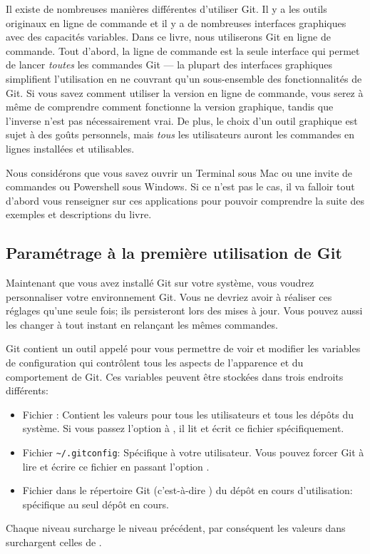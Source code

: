 Il existe de nombreuses manières différentes d'utiliser Git.
Il y a les outils originaux en ligne de commande et il y a de nombreuses interfaces graphiques avec des capacités variables.
Dans ce livre, nous utiliserons Git en ligne de commande.
Tout d'abord, la ligne de commande est la seule interface qui permet de lancer \emph{toutes} les commandes Git --- la plupart des interfaces graphiques simplifient l'utilisation en ne couvrant qu'un sous-ensemble des fonctionnalités de Git.
Si vous savez comment utiliser la version en ligne de commande, vous serez à même de comprendre comment fonctionne la version graphique, tandis que l'inverse n'est pas nécessairement vrai.
De plus, le choix d'un outil graphique est sujet à des goûts personnels, mais \emph{tous} les utilisateurs auront les commandes en lignes installées et utilisables.

Nous considérons que vous savez ouvrir un Terminal sous Mac ou une invite de commandes ou Powershell sous Windows.
Si ce n'est pas le cas, il va falloir tout d'abord vous renseigner sur ces applications pour pouvoir comprendre la suite des exemples et descriptions du livre.

\subsection{Paramétrage à la première utilisation de Git}
\label{sec:git:first_time}

Maintenant que vous avez installé Git sur votre système, vous voudrez personnaliser votre environnement Git.
Vous ne devriez avoir à réaliser ces réglages qu'une seule fois;
ils persisteront lors des mises à jour.
Vous pouvez aussi les changer à tout instant en relançant les mêmes commandes.

Git contient un outil appelé  pour vous permettre de voir et modifier les variables de configuration qui contrôlent tous les aspects de l'apparence et du comportement de Git.
Ces variables peuvent être stockées dans trois endroits différents:
\begin{itemize}
\item Fichier : Contient les valeurs pour tous les utilisateurs et tous les dépôts du système.
Si vous passez l'option  à , il lit et écrit ce fichier spécifiquement.
\item Fichier \verb=~/.gitconfig=: Spécifique à votre utilisateur.
Vous pouvez forcer Git à lire et écrire ce fichier en passant l'option .
\item Fichier  dans le répertoire Git (c'est-à-dire ) du dépôt en cours d'utilisation: spécifique au seul dépôt en cours.
\end{itemize}
Chaque niveau surcharge le niveau précédent, par conséquent les valeurs dans  surchargent celles de .

